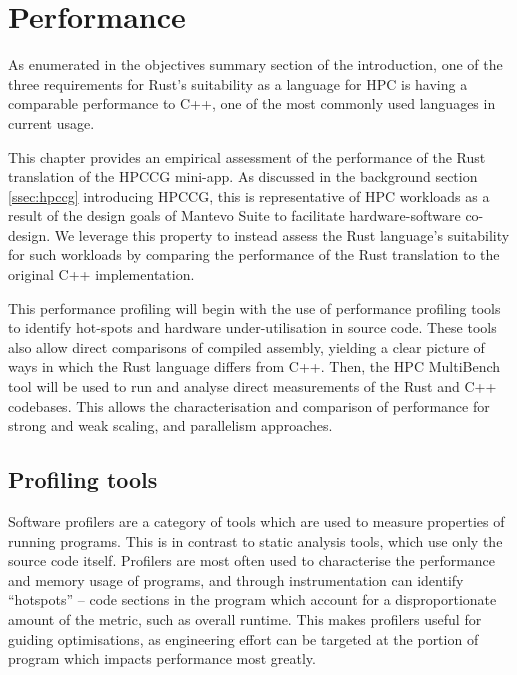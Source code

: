 \chapter{Performance}
\label{ch:performance}


As enumerated in the objectives summary section of the introduction, one of the three requirements for Rust's suitability as a language for \acrshort{HPC} is having a comparable performance to C++, one of the most commonly used languages in current usage.

This chapter provides an empirical assessment of the performance of the Rust translation of the HPCCG \acrshort{mini-app}. As discussed in the background section \ref{ssec:hpccg} introducing HPCCG, this is representative of \acrshort{HPC} workloads as a result of the design goals of Mantevo Suite to facilitate hardware-software co-design. We leverage this property to instead assess the Rust language's suitability for such workloads by comparing the performance of the Rust translation to the original C++ implementation.

This performance profiling will begin with the use of performance profiling tools to identify hot-spots and hardware under-utilisation in source code. These tools also allow direct comparisons of compiled assembly, yielding a clear picture of ways in which the Rust language differs from C++. Then, the HPC MultiBench tool will be used to run and analyse direct measurements of the Rust and C++ codebases. This allows the characterisation and comparison of performance for strong and weak scaling, and parallelism approaches.

\section{Profiling tools}
\label{sec:profiling-tools}

Software profilers are a category of tools which are used to measure properties of running programs. This is in contrast to static analysis tools, which use only the source code itself. Profilers are most often used to characterise the performance and memory usage of programs, and through instrumentation can identify ``hotspots'' -- code sections in the program which account for a disproportionate amount of the metric, such as overall runtime. This makes profilers useful for guiding optimisations, as engineering effort can be targeted at the portion of program which impacts performance most greatly.

